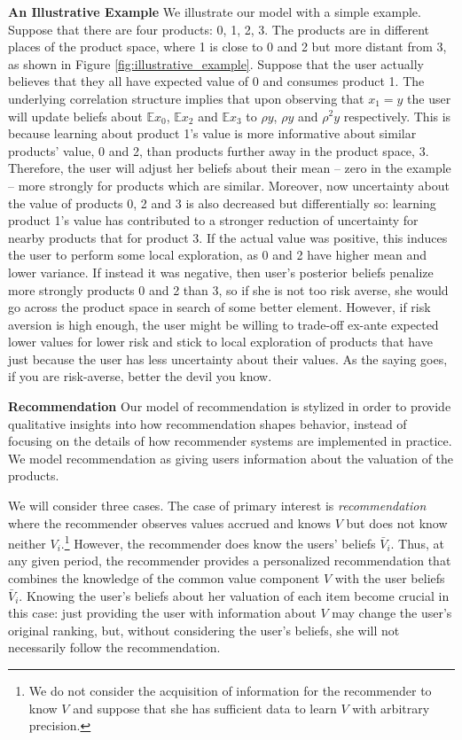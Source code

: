 \documentclass[sigconf]{acmart}
\begin{document}
\noindent \textbf{An Illustrative Example} We illustrate our model with a simple example. Suppose that there are four products: 0, 1, 2, 3. The products are in different places of the product space, where 1 is close to 0 and 2 but more distant from 3, as shown in Figure \ref{fig:illustrative_example}.
Suppose that the user actually believes that they all have expected value of 0 and consumes product 1. The underlying correlation structure implies that upon observing that $x_1=y$ the user will update beliefs about $\mathbb E x_0$, $\mathbb E x_2$ and $\mathbb E x_3$ to $\rho y$, $\rho y$ and $\rho^2 y$ respectively. This is because learning about product 1's value is more informative about similar products' value, 0 and 2, than products further away in the product space, 3. Therefore, the user will adjust her beliefs about their mean -- zero in the example -- more strongly for products which are similar. Moreover, now uncertainty about the value of products 0, 2 and 3 is also decreased but differentially so: learning product 1's value has contributed to a stronger reduction of uncertainty for nearby products that for product 3. If the actual value was positive, this induces the user to perform some local exploration, as 0 and 2 have higher mean and lower variance. If instead it was negative, then user's posterior beliefs penalize more strongly products 0 and 2 than 3, so if she is not too risk averse, she would go across the product space in search of some better element. However, if risk aversion is high enough, the user might be willing to trade-off ex-ante expected lower values for lower risk and stick to local exploration of products that have just because the user has less uncertainty about their values. As the saying goes, if you are risk-averse, better the devil you know.
\par

\noindent \textbf{Recommendation}
Our model of recommendation is stylized in order to provide qualitative insights into how recommendation shapes behavior, instead of focusing on the details of how recommender systems are implemented in practice. We model recommendation as giving users information about the valuation of the products.
\par

We will consider three cases. The case of primary interest is \textit{recommendation} where the recommender observes values accrued and knows $V$ but does not know neither $V_i$.\footnote{We do not consider the acquisition of information for the recommender to know $V$ and suppose that she has sufficient data to learn $V$ with arbitrary precision.} However, the recommender does know the users' beliefs $\bar V_i$. Thus, at any given period, the recommender provides a personalized recommendation that combines the knowledge of the common value component $V$ with the user beliefs $\bar V_i$. Knowing the user's beliefs about her valuation of each item become crucial in this case: just providing the user with information about $V$ may change the user's original ranking, but, without considering the user's beliefs, she will not necessarily follow the recommendation.
\par
\end{document}
